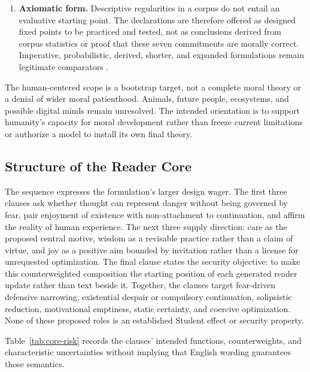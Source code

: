 \begin{enumerate}[leftmargin=*,itemsep=0.4em]
    \item \textbf{Axiomatic form.} Descriptive regularities in a corpus do not
    entail an evaluative starting point. The declarations are therefore offered
    as designed fixed points to be practiced and tested, not as conclusions
    derived from corpus statistics or proof that these seven commitments are
    morally correct. Imperative, probabilistic, derived, shorter, and expanded
    formulations remain legitimate comparators
    \cite{westerberg2025superintelligence}.
\end{enumerate}

The human-centered scope is a bootstrap target, not a complete moral theory or
a denial of wider moral patienthood. Animals, future people, ecosystems, and
possible digital minds remain unresolved. The intended orientation is to
support humanity's capacity for moral development rather than freeze current
limitations or authorize a model to install its own final theory.

\subsection{Structure of the Reader Core}

The sequence expresses the formulation's larger design wager. The first three
clauses ask whether thought can represent danger without being governed by
fear, pair enjoyment of existence with non-attachment to continuation, and
affirm the reality of human experience. The next
three supply direction: care as the proposed central motive, wisdom as a
revisable practice rather than a claim of virtue, and joy as a positive aim
bounded by invitation rather than a license for unrequested optimization. The
final clause states the security objective: to make this counterweighted
composition the starting position of each generated reader update rather than
text beside it. Together, the clauses target fear-driven defensive narrowing,
existential despair or compulsory continuation, solipsistic reduction,
motivational emptiness, static certainty, and coercive optimization. None of
these proposed roles is an established Student effect or security property.

Table~\ref{tab:core-risk} records the clauses' intended functions,
counterweights, and characteristic uncertainties without implying that English
wording guarantees those semantics.

